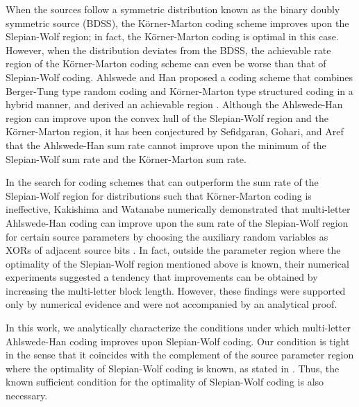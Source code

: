 \documentclass[journal,onecolumn]{IEEEtran}
\theoremstyle{definition}
\theoremstyle{remark}
\begin{document}
 When the sources follow a symmetric distribution known as the binary doubly symmetric source (BDSS),
 the K\"orner-Marton coding scheme improves upon the Slepian-Wolf region; in fact, the K\"orner-Marton coding is optimal
 in this case. However, when the distribution deviates from the BDSS, the achievable rate region of the K\"orner-Marton coding
 scheme can even be worse than that of Slepian-Wolf coding. Ahlswede and Han proposed a coding scheme that combines 
 Berger-Tung type random coding and K\"orner-Marton type structured coding in a hybrid manner, and derived an achievable region \cite{AH}.
 Although the Ahlswede-Han region can improve upon the convex hull of the Slepian-Wolf region and the K\"orner-Marton region,
 it has been conjectured by Sefidgaran, Gohari, and Aref \cite{conjecture}
 that the Ahlswede-Han sum rate cannot improve upon the minimum of the Slepian-Wolf sum rate and the K\"orner-Marton sum rate.


In the search for coding schemes that can outperform the sum rate of the Slepian-Wolf region
for distributions such that K\"orner-Marton coding is ineffective, Kakishima and Watanabe numerically demonstrated
that multi-letter Ahlswede-Han coding can improve upon the sum rate of the Slepian-Wolf region for certain source
parameters by choosing the auxiliary random variables as XORs of adjacent source bits \cite{KW}.
In fact, outside the parameter region where the optimality of the Slepian-Wolf region mentioned above is known, 
their numerical experiments suggested a tendency that improvements can be obtained by
increasing the multi-letter block length. However, these findings were supported only by numerical evidence 
and were not accompanied by an analytical proof.

In this work, we analytically characterize the conditions under which multi-letter Ahlswede-Han coding improves upon Slepian-Wolf coding.
Our condition is tight in the sense that it coincides with the complement of the source parameter region where the optimality of Slepian-Wolf coding is known, 
as stated in \cite[Ex. 16.23]{Csiszár_Körner_2011}. 
Thus, the known sufficient condition for the optimality of Slepian-Wolf coding is also necessary.
\end{document}
